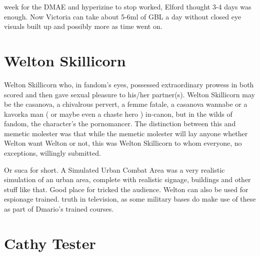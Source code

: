 \documentclass[12pt]{book}
\begin{document}
week for the DMAE and hyperizine to stop worked, Elford thought 3-4 days was enough. Now Victoria can take about 5-6ml of GBL a day without closed eye visuals built up and possibly more as time went on.






\chapter{Welton Skillicorn}

Welton Skillicorn who, in fandom's eyes, possessed extraordinary prowess in both scored and then gave sexual pleasure to his/her partner(s). Welton Skillicorn may be the casanova, a chivalrous pervert, a femme fatale, a casanova wannabe or a kavorka man ( or maybe even a chaste hero ) in-canon, but in the wilds of fandom, the character's the pornomancer. The distinction between this and memetic molester was that while the memetic molester will lay anyone whether Welton want Welton or not, this was Welton Skillicorn to whom everyone, no exceptions, willingly submitted.



Or suca for short. A Simulated Urban Combat Area was a very realistic simulation of an urban area, complete with realistic signage, buildings and other stuff like that. Good place for tricked the audience. Welton can also be used for espionage trained. truth in television, as some military bases do make use of these as part of Dmario's trained courses.



\chapter{Cathy Tester}
\end{document}
